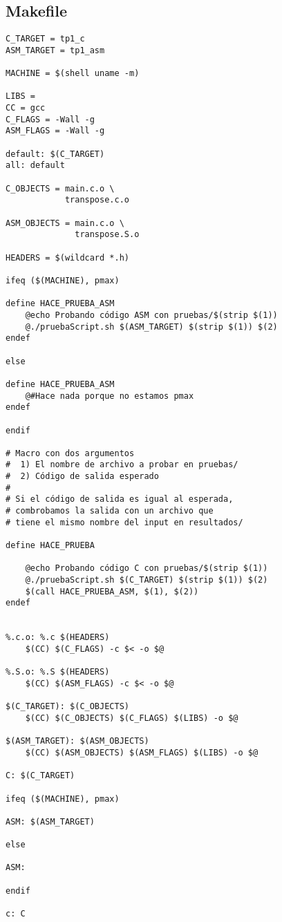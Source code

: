 \documentclass[a4paper]{article}
\begin{document}
\subsection{Makefile}

\begin{verbatim}
C_TARGET = tp1_c
ASM_TARGET = tp1_asm

MACHINE = $(shell uname -m)

LIBS =
CC = gcc
C_FLAGS = -Wall -g
ASM_FLAGS = -Wall -g

default: $(C_TARGET)
all: default

C_OBJECTS = main.c.o \
		    transpose.c.o

ASM_OBJECTS = main.c.o \
			  transpose.S.o

HEADERS = $(wildcard *.h)

ifeq ($(MACHINE), pmax)

define HACE_PRUEBA_ASM
	@echo Probando código ASM con pruebas/$(strip $(1))
	@./pruebaScript.sh $(ASM_TARGET) $(strip $(1)) $(2)
endef

else

define HACE_PRUEBA_ASM
	@#Hace nada porque no estamos pmax
endef

endif

# Macro con dos argumentos
#  1) El nombre de archivo a probar en pruebas/
#  2) Código de salida esperado
#
# Si el código de salida es igual al esperada,
# combrobamos la salida con un archivo que
# tiene el mismo nombre del input en resultados/

define HACE_PRUEBA

	@echo Probando código C con pruebas/$(strip $(1))
	@./pruebaScript.sh $(C_TARGET) $(strip $(1)) $(2)
	$(call HACE_PRUEBA_ASM, $(1), $(2))
endef


%.c.o: %.c $(HEADERS)
	$(CC) $(C_FLAGS) -c $< -o $@

%.S.o: %.S $(HEADERS)
	$(CC) $(ASM_FLAGS) -c $< -o $@

$(C_TARGET): $(C_OBJECTS)
	$(CC) $(C_OBJECTS) $(C_FLAGS) $(LIBS) -o $@

$(ASM_TARGET): $(ASM_OBJECTS)
	$(CC) $(ASM_OBJECTS) $(ASM_FLAGS) $(LIBS) -o $@

C: $(C_TARGET)

ifeq ($(MACHINE), pmax)

ASM: $(ASM_TARGET)

else

ASM:

endif

c: C


\end{verbatim}
\end{document}
